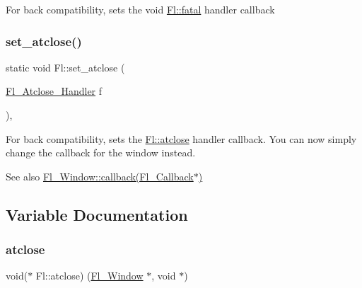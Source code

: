 For back compatibility, sets the void \hyperlink{group__group__comdlg_ga5f072307352192f9f7f8cff31c343526}{Fl\+::fatal} handler callback \mbox{\label{group__fl__windows_gafe2b995bdaf60c5a5b2326e8845897c9}} 
\subsubsection{\texorpdfstring{set\+\_\+atclose()}{set\_atclose()}}
{\footnotesize\ttfamily static void Fl\+::set\+\_\+atclose (\begin{DoxyParamCaption}\item[{\hyperlink{group__callback__functions_gac2b36f6e136744adb3e3ec87e068c169}{Fl\+\_\+\+Atclose\+\_\+\+Handler}}]{f }\end{DoxyParamCaption})\hspace{0.3cm}{\ttfamily [inline]}, {\ttfamily [static]}}

For back compatibility, sets the \hyperlink{group__fl__windows_ga62b8358ae9f5c183d1f2b92fa6a779c5}{Fl\+::atclose} handler callback. You can now simply change the callback for the window instead. \begin{DoxySeeAlso}{See also}
\hyperlink{class_fl___widget_a345aff3537426aa79b3e4c5c5b1fec7b}{Fl\+\_\+\+Window\+::callback(\+Fl\+\_\+\+Callback$\ast$)} 
\end{DoxySeeAlso}


\subsection{Variable Documentation}
\mbox{\label{group__fl__windows_ga62b8358ae9f5c183d1f2b92fa6a779c5}} 
\subsubsection{\texorpdfstring{atclose}{atclose}}
{\footnotesize\ttfamily void($\ast$ Fl\+::atclose) (\hyperlink{class_fl___window}{Fl\+\_\+\+Window} $\ast$, void $\ast$)\hspace{0.3cm}{\ttfamily [static]}}

